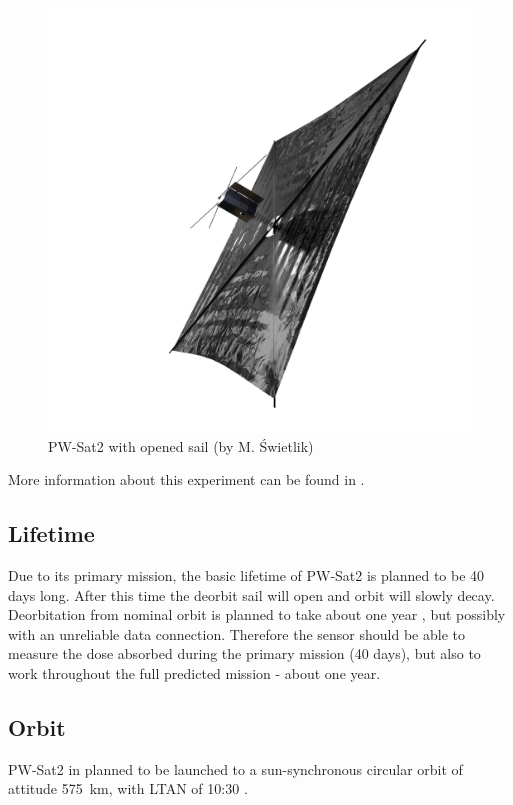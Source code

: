         \begin{figure}[H]
            \centering
            \includegraphics[width=0.7\paperwidth]{img/04/PW-Sat2_render_02.png}
            \caption{PW-Sat2 with opened sail (by M. Świetlik)}
            \label{PW-Sat_render_sail}
        \end{figure}

        More information about this experiment can be found in \cite{DDC_article}.

    \subsection{Lifetime}
        Due to its primary mission, the basic lifetime of PW-Sat2 is planned to be 40 days long. After this time the deorbit sail will open and orbit will slowly decay. Deorbitation from nominal orbit is planned to take about one year \cite{PWSAT_MA_CDR}, but possibly with an unreliable data connection. Therefore the sensor should be able to measure the dose absorbed during the primary mission (40 days), but also to work throughout the full predicted mission - about one year.

    \subsection{Orbit}
        PW-Sat2 in planned to be launched to a sun-synchronous circular orbit of attitude \SI{575}{\kilo\meter}, with LTAN of 10:30 \cite{PWSAT_MA_CDR}.


